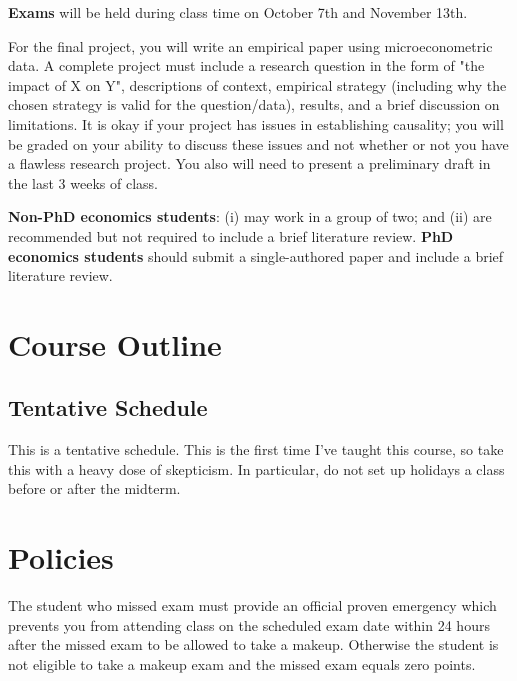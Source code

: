 \documentclass[12pt]{article}
\begin{document}
\textbf{Exams} will be held during class time on October 7th and November 13th.

For the ﬁnal project, you will write an empirical paper using microeconometric data. 
A complete project must include a research question in the form of "the impact of X on Y", descriptions of context, empirical strategy (including why the chosen strategy is valid for the question/data), results, and a brief discussion on limitations. 
It is okay if your project has issues in establishing causality; you will be graded on your ability to discuss these issues and not whether or not you have a flawless research project.
You also will need to present a preliminary draft in the last 3 weeks of class.

\textbf{Non-PhD economics students}: (i) may work in a group of two; and (ii) are recommended but not required to include a brief literature review. 
\textbf{PhD economics students} should submit a
single-authored paper and include a brief literature review.



\section*{Course Outline}

\subsection*{Tentative Schedule}

This is a tentative schedule. This is the first time I've taught this course, so take this with a heavy dose of skepticism. In particular, do not set up holidays a class before or after the midterm. 

\begin{landscape}
  
\end{landscape}







\section*{Policies}

The student who missed exam must provide an official proven emergency which prevents you from attending class on the scheduled exam date within 24 hours after the missed exam to be allowed to take a makeup. Otherwise the student is not eligible to take a makeup exam and the missed exam equals zero points.
\end{document}
